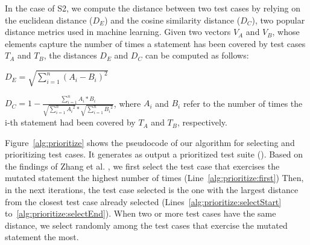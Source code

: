 In the case of S2, we compute the distance between two test cases by relying on the euclidean distance ($D_E$) and the cosine similarity distance ($D_C$), two popular distance metrics used in machine learning.
Given two vectors $V_A$ and $V_B$, whose elements capture the number of times a statement has been covered by test cases $T_A$ and $T_B$, the distances $D_E$ and $D_C$ can be computed as follows:

$D_E=\sqrt{\sum_{i=1}^{n}(A_i-B_i)^2}$

$D_C= 1-\frac{\sum_{i=1}^{n}A_i*B_i}{\sqrt{\sum_{i=1}^{n}{A_i}^2}*\sqrt{\sum_{i=1}^{n}{B_i}^2}}$,
where $A_i$ and $B_i$ refer to the number of times the i-th statement had been covered by $T_A$ and $T_B$, respectively.

Figure~\ref{alg:prioritize} shows the pseudocode of our algorithm for selecting and prioritizing test cases. It generates as output
a prioritized test suite ().
Based on the findings of Zhang et al. \cite{zhang2013faster}, we first select the test case that exercises the mutated statement the highest number of times (Line~\ref{alg:prioritize:first}) 
Then, in the next iterations, the test case selected is the one with the largest distance from the closest test case already selected (Lines~\ref{alg:prioritize:selectStart} to~\ref{alg:prioritize:selectEnd}).
When two or more test cases have the same distance, we select randomly among the test cases that exercise the mutated statement the most.


